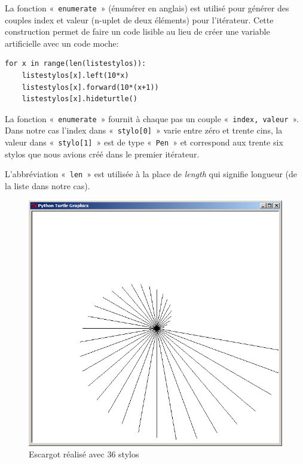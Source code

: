 La fonction «~\texttt{enumerate}~»  (énumérer en anglais) est utilisé pour générer des couples index et valeur (n-uplet de deux éléments) pour l'itérateur. Cette construction permet de faire un code lisible au lieu de créer une variable artificielle avec un code moche:\\

\begin{Verbatim}[frame=single,rulecolor=\color{gray}, label=moche]
for x in range(len(listestylos)): 
    listestylos[x].left(10*x)
    listestylos[x].forward(10*(x+1))
    listestylos[x].hideturtle()
\end{Verbatim}

La fonction «~\texttt{enumerate}~» fournit à chaque pas un couple «~\texttt{index, valeur}~». Dans notre cas l'index dans «~\texttt{stylo[0]}~» varie entre zéro et trente cins, la valeur dans «~\texttt{stylo[1]}~» est de type «~\texttt{Pen}~» et correspond aux trente six stylos que nous avions créé dans le premier itérateur.

L'abbréviation «~\texttt{len}~» est utilisée à la place de \emph{length} qui signifie longueur (de la liste dans notre cas).

\begin{figure}[h!]
\centering
\includegraphics[scale=0.4]{images/escargot}
\caption{Escargot réalisé avec 36 stylos}\label{fig:escargot}
\end{figure}

